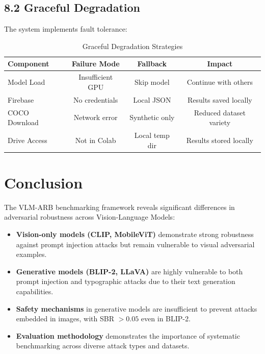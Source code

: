 \documentclass[12pt, a4paper]{article}
\begin{document}
\subsection{8.2 Graceful Degradation}

The system implements fault tolerance:

\begin{table}[H]
\centering
\begin{tabular}{|l|c|c|c|}
\hline
\textbf{Component} & \textbf{Failure Mode} & \textbf{Fallback} & \textbf{Impact} \\
\hline
Model Load & Insufficient GPU & Skip model & Continue with others \\
Firebase & No credentials & Local JSON & Results saved locally \\
COCO Download & Network error & Synthetic only & Reduced dataset variety \\
Drive Access & Not in Colab & Local temp dir & Results stored locally \\
\hline
\end{tabular}
\caption{Graceful Degradation Strategies}
\end{table}

\section{Conclusion}

The VLM-ARB benchmarking framework reveals significant differences in adversarial robustness across Vision-Language Models:

\begin{itemize}
    \item \textbf{Vision-only models (CLIP, MobileViT)} demonstrate strong robustness against prompt injection attacks but remain vulnerable to visual adversarial examples.
    
    \item \textbf{Generative models (BLIP-2, LLaVA)} are highly vulnerable to both prompt injection and typographic attacks due to their text generation capabilities.
    
    \item \textbf{Safety mechanisms} in generative models are insufficient to prevent attacks embedded in images, with SBR $> 0.05$ even in BLIP-2.
    
    \item \textbf{Evaluation methodology} demonstrates the importance of systematic benchmarking across diverse attack types and datasets.
\end{itemize}
\end{document}
